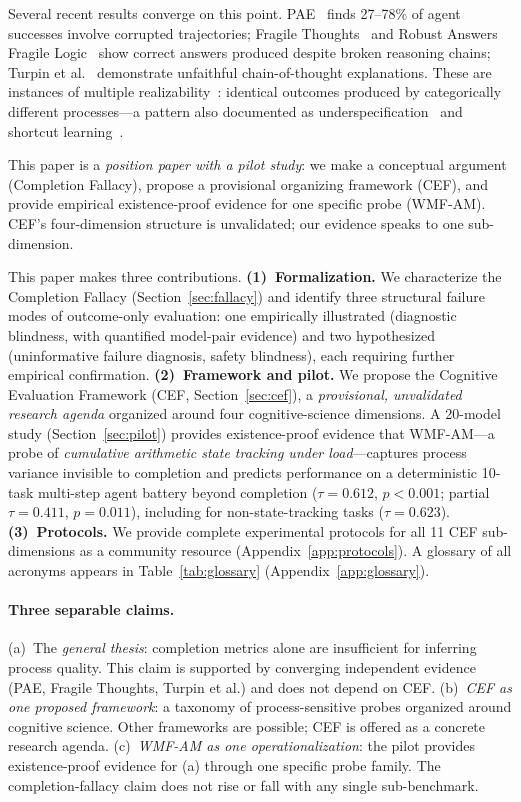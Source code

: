 \documentclass{article}
\begin{document}
Several recent results converge on this point.
PAE~\citep{xie2026m3} finds 27--78\% of agent successes involve
corrupted trajectories; Fragile
Thoughts~\citep{aravindan2026fragile} and Robust Answers Fragile
Logic~\citep{jiang2026robustanswersfragilelogic} show correct answers
produced despite broken reasoning chains;
Turpin et al.~\citep{turpin2023language} demonstrate unfaithful
chain-of-thought explanations. These are instances of multiple
realizability~\citep{putnam1967}: identical outcomes produced by
categorically different processes---a pattern also documented as
underspecification~\citep{damour2022underspecification} and shortcut
learning~\citep{geirhos2020shortcut}.

This paper is a \emph{position paper with a pilot study}: we make a conceptual argument (Completion Fallacy), propose a provisional organizing framework (CEF), and provide empirical existence-proof evidence for one specific probe (WMF-AM). CEF's four-dimension structure is unvalidated; our evidence speaks to one sub-dimension.

This paper makes three contributions.
\textbf{(1)~Formalization.} We characterize the Completion Fallacy
(Section~\ref{sec:fallacy}) and identify three structural failure modes
of outcome-only evaluation: one empirically illustrated (diagnostic blindness,
with quantified model-pair evidence) and two hypothesized (uninformative
failure diagnosis, safety blindness), each requiring further empirical confirmation.
\textbf{(2)~Framework and pilot.} We propose the Cognitive Evaluation
Framework (CEF, Section~\ref{sec:cef}), a \emph{provisional, unvalidated
research agenda} organized around four cognitive-science dimensions.
A 20-model study
(Section~\ref{sec:pilot}) provides existence-proof evidence that
WMF-AM---a probe of \emph{cumulative arithmetic state tracking under
load}---captures process variance invisible to completion
and predicts performance on a deterministic 10-task multi-step
agent battery beyond completion ($\tau{=}0.612$, $p{<}0.001$;
partial $\tau{=}0.411$, $p{=}0.011$), including for non-state-tracking tasks ($\tau{=}0.623$).
\textbf{(3)~Protocols.} We provide complete experimental protocols
for all 11 CEF sub-dimensions as a community resource
(Appendix~\ref{app:protocols}).
A glossary of all acronyms appears in Table~\ref{tab:glossary}
(Appendix~\ref{app:glossary}).

\paragraph{Three separable claims.}
(a)~The \emph{general thesis}: completion metrics alone are insufficient
for inferring process quality. This claim is supported by converging
independent evidence (PAE, Fragile Thoughts, Turpin et al.) and does
not depend on CEF.
(b)~\emph{CEF as one proposed framework}: a taxonomy of
process-sensitive probes organized around cognitive science. Other
frameworks are possible; CEF is offered as a concrete research agenda.
(c)~\emph{WMF-AM as one operationalization}: the pilot provides
existence-proof evidence for (a) through one specific probe family.
The completion-fallacy claim does not rise or fall with any single
sub-benchmark.
\end{document}

